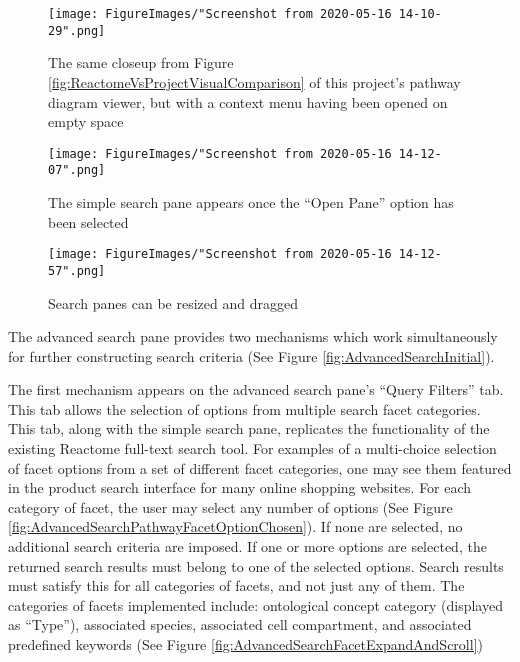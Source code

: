 \documentclass[12pt, letterpaper]{report}
\begin{document}
\begin{figure}[h!]
	\begin{center}
		\texttt{[image: FigureImages/"Screenshot from 2020-05-16 14-10-29".png]}
	\end{center}
	\caption{The same closeup from Figure \ref{fig:ReactomeVsProjectVisualComparison} of this project's pathway diagram viewer, but with a context menu having been opened on empty space}
	\label{fig:ContextMenuOpened}
\end{figure}

\newpage
\begin{landscape}
\begin{figure}[h!]
	\begin{center}
		\texttt{[image: FigureImages/"Screenshot from 2020-05-16 14-12-07".png]}
	\end{center}
	\caption{The simple search pane appears once the ``Open Pane'' option has been selected}
	\label{fig:SimpleSearchPaneAppears}
\end{figure}

\end{landscape}
\newpage

\begin{figure}[h!]
	\begin{center}
		\texttt{[image: FigureImages/"Screenshot from 2020-05-16 14-12-57".png]}
	\end{center}
	\caption{Search panes can be resized and dragged}
	\label{fig:PaneResizeAndDrag}
\end{figure}

The advanced search pane provides two mechanisms which work simultaneously for further constructing search criteria (See Figure \ref{fig:AdvancedSearchInitial}).

The first mechanism appears on the advanced search pane's ``Query Filters'' tab. This tab allows the selection of options from multiple search facet categories. This tab, along with the simple search pane, replicates the functionality of the existing Reactome full-text search tool. For examples of a multi-choice selection of facet options from a set of different facet categories, one may see them featured in the product search interface for many online shopping websites. For each category of facet, the user may select any number of options (See Figure \ref{fig:AdvancedSearchPathwayFacetOptionChosen}). If none are selected, no additional search criteria are imposed. If one or more options are selected, the returned search results must belong to one of the selected options. Search results must satisfy this for all categories of facets, and not just any of them. The categories of facets implemented include: ontological concept category (displayed as ``Type''), associated species, associated cell compartment, and associated predefined keywords (See Figure \ref{fig:AdvancedSearchFacetExpandAndScroll})
\end{document}
